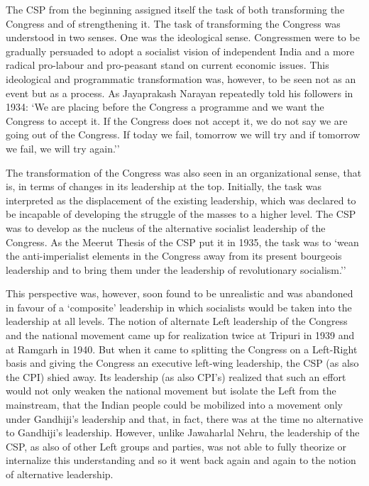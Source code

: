 The CSP from the beginning assigned itself the task of both transforming the Congress and of strengthening it. The task of transforming the Congress was understood in two senses. One was the ideological sense. Congressmen were to be gradually persuaded to adopt a socialist vision of independent India and a more radical pro-labour and pro-peasant stand on current economic issues. This ideological and programmatic transformation was, however, to be seen not as an event but as a process. As Jayaprakash Narayan repeatedly told his followers in 1934: `We are placing before the Congress a programme and we want the Congress to accept it. If the Congress does not accept it, we do not say we are going out of the Congress. If today we fail, tomorrow we will try and if tomorrow we fail, we will try again.'' 

The transformation of the Congress was also seen in an organizational sense, that is, in terms of changes in its leadership at the top. Initially, the task was interpreted as the displacement of the existing leadership, which was declared to be incapable of developing the struggle of the masses to a higher level. The CSP was to develop as the nucleus of the alternative socialist leadership of the Congress. As the Meerut Thesis of the CSP put it in 1935, the task was to `wean the anti-imperialist elements in the Congress away from its present bourgeois leadership and to bring them under the leadership of revolutionary socialism.'' 

This perspective was, however, soon found to be unrealistic and was abandoned in favour of a `composite' leadership in which socialists would be taken into the leadership at all levels. The notion of alternate Left leadership of the Congress and the national movement came up for realization twice at Tripuri in 1939 and at Ramgarh in 1940. But when it came to splitting the Congress on a Left-Right basis and giving the Congress an executive left-wing leadership, the CSP (as also the CPI) shied away. Its leadership (as also CPI's) realized that such an effort would not only weaken the national movement but isolate the Left from the mainstream, that the Indian people could be mobilized into a movement only under Gandhiji's leadership and that, in fact, there was at the time no alternative to Gandhiji's leadership. However, unlike Jawaharlal Nehru, the leadership of the CSP, as also of other Left groups and parties, was not able to fully theorize or internalize this understanding and so it went back again and again to the notion of alternative leadership. 


